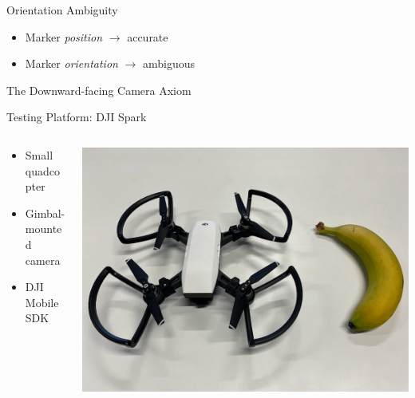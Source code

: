 \documentclass[aspectratio=169]{beamer}
\begin{document}
\begin{frame}{Orientation Ambiguity}
	\begin{itemize}
		\item Marker \emph{position} $\rightarrow$ accurate
		\item Marker \emph{orientation} $\rightarrow$ ambiguous
	\end{itemize}
\end{frame}

\begin{frame}{The Downward-facing Camera Axiom}
\end{frame}

\begin{frame}{Testing Platform: DJI Spark}
	\begin{columns}
	\begin{column}{0.5\textwidth}
	\begin{itemize}
		\item Small quadcopter
		\item Gimbal-mounted camera
		\item DJI Mobile SDK
	\end{itemize}
	\end{column}
	\begin{column}{0.5\textwidth}
		\centering
		\includegraphics[width=\textwidth]{./images/dji_spark}
	\end{column}
	\end{columns}
\end{frame}
\end{document}
